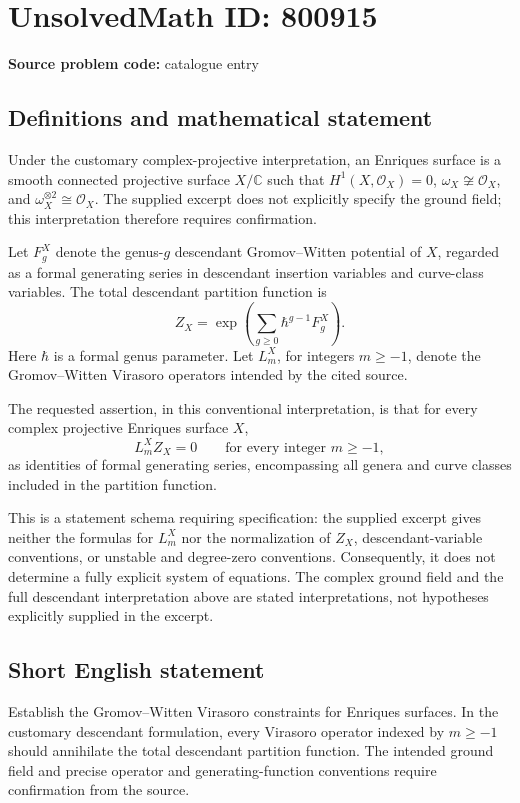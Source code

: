 \documentclass[11pt]{article}
\newcommand{\C}{\mathbb{C}}
\begin{document}
\section*{UnsolvedMath ID: 800915}
\textbf{Source problem code:} catalogue entry
\subsection{Definitions and mathematical statement}
Under the customary complex-projective interpretation, an Enriques surface is a smooth connected projective surface \(X/\C\) such that \(H^1(X,\mathcal O_X)=0\), \(\omega_X\not\cong\mathcal O_X\), and \(\omega_X^{\otimes 2}\cong\mathcal O_X\). The supplied excerpt does not explicitly specify the ground field; this interpretation therefore requires confirmation.

Let \(F_g^X\) denote the genus-\(g\) descendant Gromov--Witten potential of \(X\), regarded as a formal generating series in descendant insertion variables and curve-class variables. The total descendant partition function is
\[
Z_X=\exp\!\left(\sum_{g\geq 0}\hbar^{g-1}F_g^X\right).
\]
Here \(\hbar\) is a formal genus parameter. Let \(L_m^X\), for integers \(m\geq -1\), denote the Gromov--Witten Virasoro operators intended by the cited source.

The requested assertion, in this conventional interpretation, is that for every complex projective Enriques surface \(X\),
\[
L_m^X Z_X=0\qquad\text{for every integer }m\geq -1,
\]
as identities of formal generating series, encompassing all genera and curve classes included in the partition function.

This is a statement schema requiring specification: the supplied excerpt gives neither the formulas for \(L_m^X\) nor the normalization of \(Z_X\), descendant-variable conventions, or unstable and degree-zero conventions. Consequently, it does not determine a fully explicit system of equations. The complex ground field and the full descendant interpretation above are stated interpretations, not hypotheses explicitly supplied in the excerpt.
\subsection{Short English statement}
Establish the Gromov--Witten Virasoro constraints for Enriques surfaces. In the customary descendant formulation, every Virasoro operator indexed by \(m\geq -1\) should annihilate the total descendant partition function. The intended ground field and precise operator and generating-function conventions require confirmation from the source.
\end{document}
